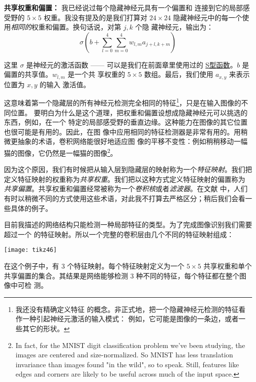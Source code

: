 \textbf{共享权重和偏置：} 我已经说过每个隐藏神经元具有一个偏置和
连接到它的局部感受野的 $5 \times 5$ 权重。我没有提及的是我们打算对 $24 \times
24$ 隐藏神经元中的每一个使用\emph{相同的}权重和偏置。换句话说，对第 $j, k$ 个隐
藏神经元，输出为：
\begin{equation}
  \sigma\left(b + \sum_{l=0}^4 \sum_{m=0}^4  w_{l,m} a_{j+l, k+m} \right)
  \label{eq:125}\tag{125}
\end{equation}

这里 $\sigma$ 是神经元的激活函数 —— 可以是我们在前面章里使用过的
\hyperref[sec:sigmoid_neurons]{S型函数}。$b$ 是偏置的共享值。$w_{l,m}$ 是一个共
享权重的 $5 \times 5$ 数组。最后，我们使用 $a_{x, y}$ 来表示位置为 $x, y$ 的输入
激活值。

这意味着第一个隐藏层的所有神经元检测完全相同的特征\footnote{我还没有精确定义特征
  的概念。非正式地，把一个隐藏神经元检测的特征看作一种引起神经元激活的输入模式：
  例如，它可能是图像的一条边，或者一些其它的形状。}，只是在输入图像的不同位置。
要明白为什么是这个道理，把权重和偏置设想成隐藏神经元可以挑选的东西，例如，在一个
特定的局部感受野的垂直边缘。这种能力在图像的其它位置也很可能是有用的。因此，在图
像中应用相同的特征检测器是非常有用的。用稍微更抽象的术语，卷积网络能很好地适应图
像的平移不变性：例如稍稍移动一幅猫的图像，它仍然是一幅猫的图像\footnote{In fact,
  for the MNIST digit classification problem we've been studying, the images are
  centered and size-normalized. So MNIST has less translation invariance than
  images found "in the wild", so to speak. Still, features like edges and
  corners are likely to be useful across much of the input space.}。

因为这个原因，我们有时候把从输入层到隐藏层的映射称为一个\emph{特征映射}。我们把
定义特征映射的权重称为\emph{共享权重}。我们把以这种方式定义特征映射的偏置称为%
\emph{共享偏置}。共享权重和偏置经常被称为一个\emph{卷积核}或者\emph{滤波器}。在文献
中，人们有时以稍微不同的方式使用这些术语，对此我不打算去严格区分；稍后我们会看一
些具体的例子。

目前我描述的网络结构只能检测一种局部特征的类型。为了完成图像识别我们需要超过一个
的特征映射。所以一个完整的卷积层由几个不同的特征映射组成：
\begin{center}
  \texttt{[image: tikz46]}
\end{center}

在这个例子中，有 3 个特征映射。每个特征映射定义为一个 $5 \times 5$ 共享权重和单个
共享偏置的集合。其结果是网络能够检测 3 种不同的特征，每个特征都在整个图像中可检
测。

